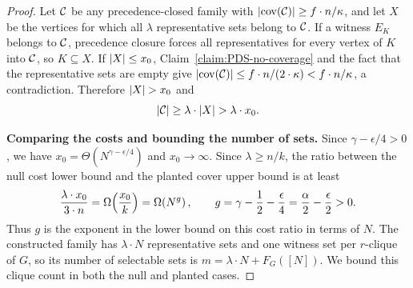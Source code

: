 \begin{proof}
    Let $\mathcal{C}$ be any precedence-closed family with $\mathopen{}\left| \operatorname{cov}\mathopen{}\left( \mathcal{C} \right) \right|\geq f\cdot n/\kappa$, and let $X$ be the vertices for which all $\lambda$ representative sets belong to $\mathcal{C}$. If a witness $E_K$ belongs to $\mathcal{C}$, precedence closure forces all representatives for every vertex of $K$ into $\mathcal{C}$, so $K\subseteq X$. If $\mathopen{}\left| X \right|\leq x_0$, Claim~\ref{claim:PDS-no-coverage} and the fact that the representative sets are empty give $\mathopen{}\left| \operatorname{cov}\mathopen{}\left( \mathcal{C} \right) \right|\leq f\cdot n/(2\cdot\kappa)<f\cdot n/\kappa$, a contradiction. Therefore $\spr{X}>x_0$ and
    \[
        \spr{\cC}\geq\lambda \cdot \spr{X}>\lambda \cdot x_0.
    \]

    \par\noindent\textbf{Comparing the costs and bounding the number of sets.}
    Since $\gamma-\epsilon/4>0$, we have $x_0=\Theta(N^{\gamma-\epsilon/4})$ and $x_0\to\infty$. Since $\lambda\geq n/k$, the ratio between the null cost lower bound and the planted cover upper bound is at least
    \[
        \frac{\lambda \cdot x_0}{3\cdot n}
        =\Omega\mathopen{}\left( \frac{x_0}{k} \right)
        =\Omega\mathopen{}\left( N^g \right),\qquad
        g=\gamma-\frac12-\frac\epsilon4
        =\frac\alpha2-\frac\epsilon2>0.
    \]
    Thus $g$ is the exponent in the lower bound on this cost ratio in terms of $N$. The constructed family has $\lambda\cdot N$ representative sets and one witness set per $r$-clique of $G$, so its number of selectable sets is $m=\lambda\cdot N+F_G([N])$. We bound this clique count in both the null and planted cases.


\end{proof}
